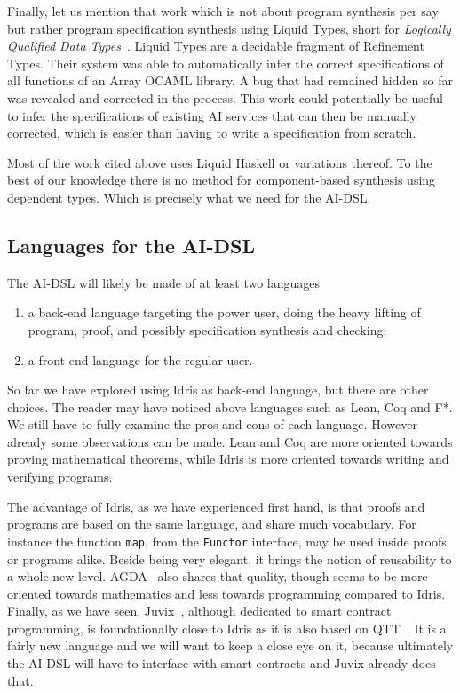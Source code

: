 \documentclass[]{report}
\begin{document}
Finally, let us mention that work which is not about program synthesis
per say but rather program specification synthesis using Liquid Types,
short for \emph{Logically Qualified Data Types}~\cite{Rondon2008}.
Liquid Types are a decidable fragment of Refinement Types.  Their
system was able to automatically infer the correct specifications of
all functions of an Array OCAML library.  A bug that had remained
hidden so far was revealed and corrected in the process.  This work
could potentially be useful to infer the specifications of existing AI
services that can then be manually corrected, which is easier than
having to write a specification from scratch.

Most of the work cited above uses Liquid Haskell or variations
thereof.  To the best of our knowledge there is no method for
component-based synthesis using dependent types.  Which is precisely
what we need for the AI-DSL.

\subsection{Languages for the AI-DSL}

The AI-DSL will likely be made of at least two languages
\begin{enumerate}
\item a back-end language targeting the power user, doing the heavy
  lifting of program, proof, and possibly specification synthesis and
  checking;
\item a front-end language for the regular user.
\end{enumerate}
So far we have explored using Idris as back-end language, but there
are other choices.  The reader may have noticed above languages such
as Lean, Coq and F*.  We still have to fully examine the pros and cons
of each language.  However already some observations can be made.
Lean and Coq are more oriented towards proving mathematical theorems,
while Idris is more oriented towards writing and verifying programs.

The advantage of Idris, as we have experienced first hand, is that
proofs and programs are based on the same language, and share much
vocabulary.  For instance the function \texttt{map}, from the
\texttt{Functor} interface, may be used inside proofs or programs
alike.  Beside being very elegant, it brings the notion of reusability
to a whole new level.  AGDA~\cite{Norell2009} also shares that
quality, though seems to be more oriented towards mathematics and less
towards programming compared to Idris.  Finally, as we have seen,
Juvix~\cite{Goes2020}, although dedicated to smart contract
programming, is foundationally close to Idris as it is also based on
QTT~\cite{Atkey2018}.  It is a fairly new language and we will want to
keep a close eye on it, because ultimately the AI-DSL will have to
interface with smart contracts and Juvix already does that.
\end{document}

